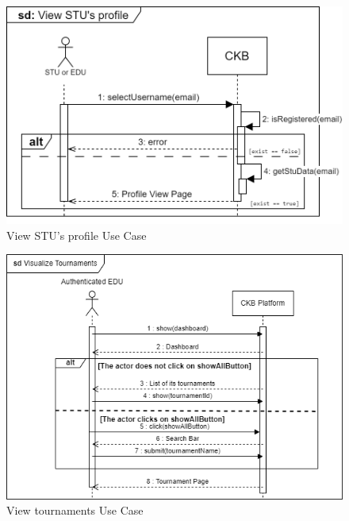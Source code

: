\begin{figure}[H]
    \centering
    \includegraphics[width=1\textwidth]{images/sequence_diagrams/.png/View_STU's_Profile - UC14.png}
    \caption{View STU's profile Use Case}
    \label{fig:uc14}
\end{figure}
\begin{figure}[H]
    \centering
    \includegraphics[width=1\textwidth]{images/sequence_diagrams/ClassDiagram-UC15.1-SequenceDiagram.png}
    \caption{View tournaments Use Case}
    \label{fig:uc15.1}
\end{figure}

